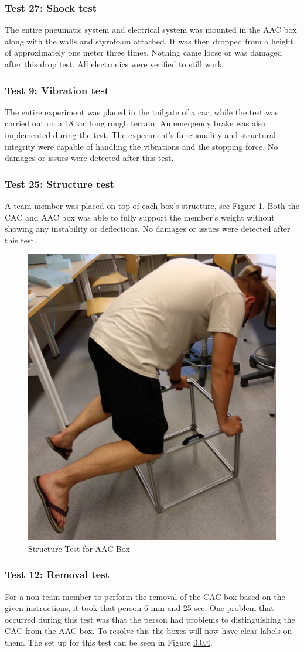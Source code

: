 \documentclass[a4paper,12pt,oneside]{article}
\begin{document}
\begin{appendices}
\subsubsection{Test 27: Shock test}
The entire pneumatic system and electrical system was mounted in the AAC box along with the walls and styrofoam attached. It was then dropped from a height of approximately one meter three times. Nothing came loose or was damaged after this drop test. All electronics were verified to still work.

\subsubsection{Test 9: Vibration test}
The entire experiment was placed in the tailgate of a car, while the test was carried out on a 18 km long rough terrain. An emergency brake was also implemented during the test. The experiment's functionality and structural integrity were capable of handling the vibrations and the stopping force.
No damages or issues were detected after this test. 

\subsubsection{Test 25: Structure test}
A team member was placed on top of each box's structure, see Figure \ref{fig:structure-test}. Both the CAC and AAC box was able to fully support the member's weight without showing any instability or deflections. No damages or issues were detected after this test.

\begin{figure}[H]
    \centering
    \includegraphics[width=0.4\linewidth]{appendix/img/test-results/structure-test.jpeg}
    \caption{Structure Test for AAC Box}
    \label{fig:structure-test}
\end{figure}


\subsubsection{Test 12: Removal test}
For a non team member to perform the removal of the CAC box based on the given instructions, it took that person 6 min and 25 sec. One problem that occurred during this test was that the person had problems to distinguishing the CAC from the AAC box. To resolve this the boxes will now have clear labels on them. The set up for this test can be seen in Figure \ref{}.


\end{appendices}
\end{document}
